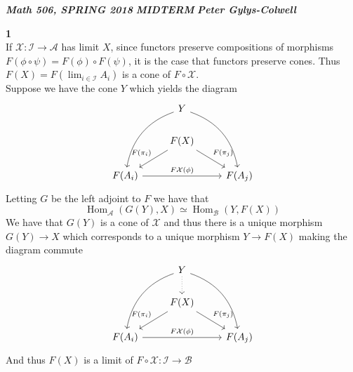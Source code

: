 \documentclass[12pt]{article}
\newenvironment{ques}[1]{\textbf{#1}\vspace{1 mm}\\ }{\bigskip}
\theoremstyle{definition}
\DeclareMathOperator\Hom{Hom}
\begin{document}
\noindent \textit{\textbf{Math 506, SPRING 2018}} \hspace{1.3cm}
\textit{\textbf{MIDTERM}} \hspace{1.3cm} \textit{\textbf{Peter
Gylys-Colwell}} 

\vspace{1cm}

\begin{ques}{1}
	If $\mathcal X:\mathcal I \to \mathcal A$ has limit $X$, since functors
	preserve compositions of morphisms $F(\phi \circ \psi) = F(\phi) \circ
	F(\psi)$, it is the case that functors preserve cones. Thus $F(X) =
	F(\lim_{i \in \mathcal I} A_i)$ is a cone of $F \circ \mathcal X$.\\
	Suppose we have the cone $Y$ which yields the diagram
	$$\begin{tikzcd}
	& Y \arrow[ddr, bend left] \arrow[ddl, bend right]& \\
	& \arrow[dl, "F(\pi_i)"'] F(X) \arrow[dr, "F(\pi_j)"] & \\
	F(A_i) \arrow[rr, "F\mathcal X(\phi)"] & & F(A_j)
	\end{tikzcd}$$
	Letting $G$ be the left adjoint to $F$ we have that 
	$$\Hom_\mathcal A (G(Y), X) \simeq \Hom_\mathcal B (Y, F(X))$$
	We have that $G(Y)$ is a cone of $\mathcal X$ and thus there is a unique
	morphism $G(Y) \to X$ which corresponds to a unique morphism $Y \to F(X)$
	making the diagram commute
	$$\begin{tikzcd}
	& Y \arrow[d, dotted] \arrow[ddr, bend left] \arrow[ddl, bend right]& \\
	& \arrow[dl, "F(\pi_i)"'] F(X) \arrow[dr, "F(\pi_j)"] & \\
	F(A_i) \arrow[rr, "F\mathcal X(\phi)"] & & F(A_j)
	\end{tikzcd}$$
	And thus $F(X)$ is a limit of $F \circ \mathcal X:\mathcal I \to \mathcal B$
\end{ques}
\end{document}

